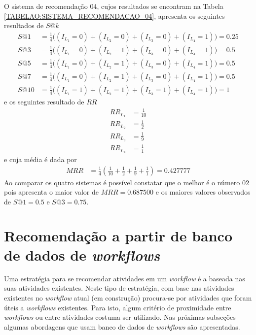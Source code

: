 O sistema de recomendação \(04\), cujos resultados se encontram na Tabela \ref{TABELAO:SISTEMA_RECOMENDACAO_04}, apresenta os seguintes resultados de \(S@k\)
\begin{align}
S@1 &= \frac{1}{4}  \Big( (I_{L_{1}} = 0) + (I_{L_{2}} = 0) + (I_{L_{3}} = 0) + (I_{L_{4}} = 1) \Big)  =	0.25 \\
S@3 &= \frac{1}{4}  \Big( (I_{L_{1}} = 0) + (I_{L_{2}} = 1) + (I_{L_{3}} = 0) + (I_{L_{4}} = 1) \Big)	 =	0.5	 \\
S@5 &= \frac{1}{4}  \Big( (I_{L_{1}} = 0) + (I_{L_{2}} = 1) + (I_{L_{3}} = 0) + (I_{L_{4}} = 1) \Big)	 =	0.5	 \\
S@7 &= \frac{1}{4}  \Big( (I_{L_{1}} = 0) + (I_{L_{2}} = 1) + (I_{L_{3}} = 0) + (I_{L_{4}} = 1) \Big)	 =	0.5	 \\
S@10 &= \frac{1}{4} \Big( (I_{L_{1}} = 1) + (I_{L_{2}} = 1) + (I_{L_{3}} = 1) + (I_{L_{4}} = 1) \Big) =	1		
\end{align}
e os seguintes resultado de \(RR\)
\begin{align}
RR_{L_{1}} &= \frac{1}{10}		\\
RR_{L_{2}} &= \frac{1}{2}		\\
RR_{L_{3}} &= \frac{1}{9}		\\
RR_{L_{4}} &= \frac{1}{1}		
\end{align}
e cuja média é dada por 
\begin{align}
MRR &= \frac{1}{4} \left( \frac{1}{10} + \frac{1}{2} + \frac{1}{9} + \frac{1}{1} \right) = 0.427777
\end{align}
Ao comparar os quatro sistemas é possível constatar que o melhor é o número \(02\) pois apresenta o maior valor de \(MRR = 0.687500\) e os maiores valores observados de \(S@1 = 0.5\) e \(S@3 = 0.75\).

\section{Recomendação a partir de banco de dados de \emph{workflows}}\label{SEC_RECOMENDACAO_BASE_WORKFLOWS}
Uma estratégia para se recomendar atividades em um \emph{workflow} é a baseada nas suas atividades existentes. Neste tipo de estratégia, com base nas atividades existentes no \emph{workflow} atual (em construção) procura-se por atividades que foram úteis a \emph{workflows} existentes. Para isto, algum critério de proximidade entre \emph{workflows} ou entre atividades costuma ser utilizado. Nas próximas subseções algumas abordagens que usam banco de dados de \emph{workflows} são apresentadas.

